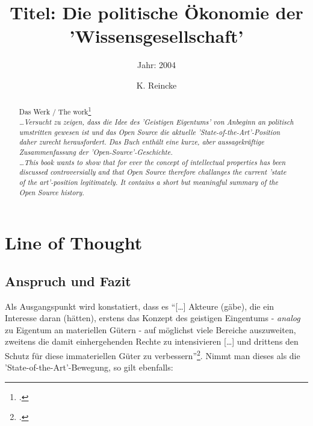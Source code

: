 \documentclass[DIV=calc,BCOR=5mm,11pt,headings=small,oneside,abstract=true, toc=bib]{scrartcl}
\begin{document}

\titlehead{Literaturexzerpt}
\subject{Autor(en): Julian Eckl}
\title{Titel: Die politische Ökonomie der 'Wissensgesellschaft'}
\subtitle{Jahr: 2004 }
\author{K. Reincke}

\maketitle

\begin{abstract}
\noindent
Das Werk / The work\footcite[][]{Eckl2004a} \\
\noindent \itshape
\ldots Versucht zu zeigen, dass die Idee des 'Geistigen Eigentums' von Anbeginn
an politisch umstritten gewesen ist und das Open Source die aktuelle
'State-of-the-Art'-Position daher zurecht herausfordert. Das Buch enthält eine
kurze, aber aussagekräftige Zusammenfassung der 'Open-Source'-Geschichte. \\
\noindent
\ldots This book wants to show that for ever the concept of intellectual
properties has been discussed controversially and that Open Source therefore
challanges the current 'state of the art'-position legitimately. It contains a
short but meaningful summary of the Open Source history.
\end{abstract}
\footnotesize
\normalsize

\section{Line of Thought}

\subsection{Anspruch und Fazit}

Als Ausgangspunkt wird konstatiert, dass es \enquote{[\ldots] Akteure (gäbe), die
ein Interesse daran (hätten), erstens das Konzept des geistigen Eingentums -
\emph{analog} zu Eigentum an materiellen Gütern - auf möglichst viele Bereiche
auszuweiten, zweitens die damit einhergehenden Rechte zu intensivieren
[\ldots] und drittens den Schutz für diese immateriellen Güter zu
verbessern}\footcite[vgl.][9]{Eckl2004a}. Nimmt man dieses als die
'State-of-the-Art'-Bewegung, so gilt ebenfalls:
\end{document}
